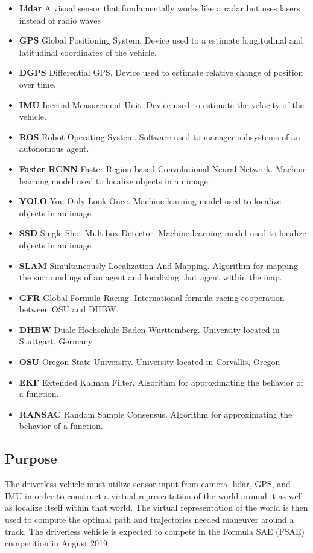 \documentclass[10pt, onecolumn, draftclsnofoot, letterpaper,compsoc]{IEEEtran}
\begin{document}
\begin{itemize}
    \item \textbf{Lidar} A visual sensor that fundamentally works like a radar but uses lasers instead of radio waves
    \item \textbf{GPS} Global Positioning System. Device used to a estimate longitudinal and latitudinal coordinates of the vehicle.
    \item \textbf{DGPS} Differential GPS. Device used to estimate relative change of position over time.
    \item \textbf{IMU} Inertial Measurement Unit. Device used to estimate the velocity of the vehicle.
    \item \textbf{ROS} Robot Operating System. Software used to manager subsystems of an autonomous agent.
    \item \textbf{Faster RCNN} Faster Region-based Convolutional Neural Network. Machine learning model used to localize objects in an image.
    \item \textbf{YOLO} You Only Look Once. Machine learning model used to localize objects in an image.
    \item \textbf{SSD} Single Shot Multibox Detector. Machine learning model used to localize objects in an image.
    \item \textbf{SLAM} Simultaneously Localization And Mapping. Algorithm for mapping the surroundings of an agent and localizing that agent within the map.
    \item \textbf{GFR} Global Formula Racing. International formula racing cooperation between OSU and DHBW.
    \item \textbf{DHBW} Duale Hochschule Baden-Wurttemberg. University located in Stuttgart, Germany
    \item \textbf{OSU} Oregon State University. University located in Corvallis, Oregon
    \item \textbf{EKF} Extended Kalman Filter. Algorithm for approximating the behavior of a function.
    \item \textbf{RANSAC} Random Sample Consensus. Algorithm for approximating the behavior of a function.
\end{itemize}



\subsection{Purpose}
 The driverless vehicle must utilize sensor input from camera, lidar, GPS, and IMU in order to construct a virtual representation of the world around it as well as localize itself within that world. The virtual representation of the world is then used to compute the optimal path and trajectories needed maneuver around a track. The driverless vehicle is expected to compete in the Formula SAE (FSAE) competition in August 2019. 
\end{document}
